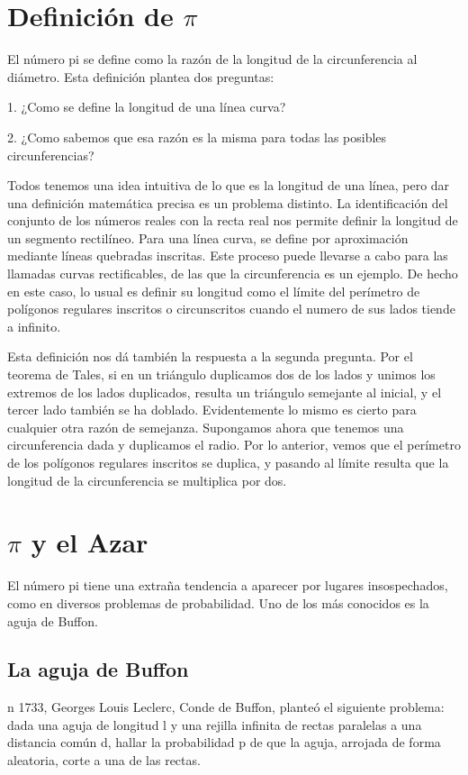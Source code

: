 \documentclass[spanish,a4paper,10pt]{article}
\begin{document}
\section{Definición de $\pi$}
El número pi se define como la razón de la longitud de la circunferencia al diámetro.
Esta definición plantea dos preguntas:

1. ¿Como se define la longitud de una línea curva?

2. ¿Como sabemos que esa razón es la misma para todas las posibles circunferencias?

Todos tenemos una idea intuitiva de lo que es la longitud de una línea, pero dar una definición matemática precisa es un problema distinto. La identificación del conjunto de los números reales con la recta real nos permite definir la longitud de un segmento rectilíneo. Para una línea curva, se define por aproximación mediante líneas quebradas inscritas. Este proceso puede llevarse a cabo para las llamadas curvas rectificables, de las que la circunferencia es un ejemplo. De hecho en este caso, lo usual es definir su longitud como el límite del perímetro de polígonos regulares inscritos o circunscritos cuando el numero de sus lados tiende a infinito.

Esta definición nos dá también la respuesta a la segunda pregunta. Por el teorema de Tales, si en un triángulo duplicamos dos de los lados y unimos los extremos de los lados duplicados, resulta un triángulo semejante al inicial, y el tercer lado también se ha doblado. Evidentemente lo mismo es cierto para cualquier otra razón de semejanza. Supongamos ahora que tenemos una circunferencia dada y duplicamos el radio. Por lo anterior, vemos que el perímetro de los polígonos regulares inscritos se duplica, y pasando al límite resulta que la longitud de la circunferencia se multiplica por dos.

\section{$\pi$ y el Azar}
El número pi tiene una extraña tendencia a aparecer por lugares insospechados, como en diversos problemas de probabilidad. Uno de los más conocidos es la aguja de Buffon.

\subsection{La aguja de Buffon}
n 1733, Georges Louis Leclerc, Conde de Buffon, planteó el siguiente problema: dada una aguja de longitud l y una rejilla infinita de rectas paralelas a una distancia común d, hallar la probabilidad p de que la aguja, arrojada de forma aleatoria, corte a una de las rectas.
\end{document}
